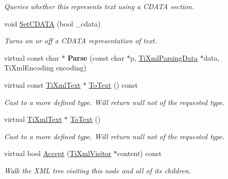 \begin{DoxyCompactItemize}
\begin{DoxyCompactList}\small\item\em Queries whether this represents text using a C\+D\+A\+TA section. \end{DoxyCompactList}\item 
void \hyperlink{class_ti_xml_text_acb17ff7c5d09b2c839393445a3de5ea9}{Set\+C\+D\+A\+TA} (bool \+\_\+cdata)\hypertarget{class_ti_xml_text_acb17ff7c5d09b2c839393445a3de5ea9}{}\label{class_ti_xml_text_acb17ff7c5d09b2c839393445a3de5ea9}

\begin{DoxyCompactList}\small\item\em Turns on or off a C\+D\+A\+TA representation of text. \end{DoxyCompactList}\item 
virtual const char $\ast$ {\bfseries Parse} (const char $\ast$p, \hyperlink{class_ti_xml_parsing_data}{Ti\+Xml\+Parsing\+Data} $\ast$data, Ti\+Xml\+Encoding encoding)\hypertarget{class_ti_xml_text_a8d2dcfa41fc73d3e62dacc2fcf633819}{}\label{class_ti_xml_text_a8d2dcfa41fc73d3e62dacc2fcf633819}

\item 
virtual const \hyperlink{class_ti_xml_text}{Ti\+Xml\+Text} $\ast$ \hyperlink{class_ti_xml_text_a895bf34ffad17f7439ab2a52b9651648}{To\+Text} () const \hypertarget{class_ti_xml_text_a895bf34ffad17f7439ab2a52b9651648}{}\label{class_ti_xml_text_a895bf34ffad17f7439ab2a52b9651648}

\begin{DoxyCompactList}\small\item\em Cast to a more defined type. Will return null not of the requested type. \end{DoxyCompactList}\item 
virtual \hyperlink{class_ti_xml_text}{Ti\+Xml\+Text} $\ast$ \hyperlink{class_ti_xml_text_ae7c3a8fd3e4dbf6c0c4363a943d72f5b}{To\+Text} ()\hypertarget{class_ti_xml_text_ae7c3a8fd3e4dbf6c0c4363a943d72f5b}{}\label{class_ti_xml_text_ae7c3a8fd3e4dbf6c0c4363a943d72f5b}

\begin{DoxyCompactList}\small\item\em Cast to a more defined type. Will return null not of the requested type. \end{DoxyCompactList}\item 
virtual bool \hyperlink{class_ti_xml_text_a43b9954ebf679557fac1a4453f337b7c}{Accept} (\hyperlink{class_ti_xml_visitor}{Ti\+Xml\+Visitor} $\ast$content) const \hypertarget{class_ti_xml_text_a43b9954ebf679557fac1a4453f337b7c}{}\label{class_ti_xml_text_a43b9954ebf679557fac1a4453f337b7c}

\begin{DoxyCompactList}\small\item\em Walk the X\+ML tree visiting this node and all of its children. \end{DoxyCompactList}\end{DoxyCompactItemize}
